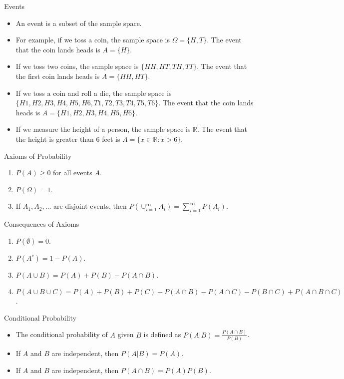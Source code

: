 \documentclass[handout]{beamer}
\begin{document}
\begin{frame}{Events}

\begin{itemize}
\item An event is a subset of the sample space.
\item For example, if we toss a coin, the sample space is  $\Omega = \{H, T\}$. The event that the coin lands heads is $A = \{H\}$.
\item If we toss two coins, the sample space is $\{HH, HT, TH, TT\}$. The event that the first coin lands heads is $A = \{HH, HT\}$.
\item If we toss a coin and roll a die, the sample space is $\{H1, H2, H3, H4, H5, H6, T1, T2, T3, T4, T5, T6\}$. The event that the coin lands heads is $A = \{H1, H2, H3, H4, H5, H6\}$.
\item If we measure the height of a person, the sample space is $\mathbb{R}$. The event that the height is greater than 6 feet is $A = \{x \in \mathbb{R}: x > 6\}$.
\end{itemize}
    
\end{frame}
\begin{frame}{Axioms of Probability}
    \begin{enumerate}
        \item $P(A) \geq 0$ for all events $A$.
        \item $P(\Omega) = 1$.
        \item If $A_1, A_2, \ldots$ are disjoint events, then $P(\cup_{i=1}^{\infty} A_i) = \sum_{i=1}^{\infty} P(A_i)$.
    \end{enumerate}
    
\end{frame}

\begin{frame}{Consequences of Axioms}
    \begin{enumerate}
        \item $P(\emptyset) = 0$.
        \item $P(A^c) = 1 - P(A)$.
        \item $P(A \cup B) = P(A) + P(B) - P(A \cap B)$.
        \item $P(A \cup B \cup C) = P(A) + P(B) + P(C) - P(A \cap B) - P(A \cap C) - P(B \cap C) + P(A \cap B \cap C)$.
    \end{enumerate}
\end{frame}
    
\begin{frame}{Conditional Probability}
    \begin{itemize}
        \item The conditional probability of $A$ given $B$ is defined as $P(A|B) = \frac{P(A \cap B)}{P(B)}$.
        \item If $A$ and $B$ are independent, then $P(A|B) = P(A)$.
        \item If $A$ and $B$ are independent, then $P(A \cap B) = P(A)P(B)$.
    \end{itemize}
    
\end{frame}
\end{document}
